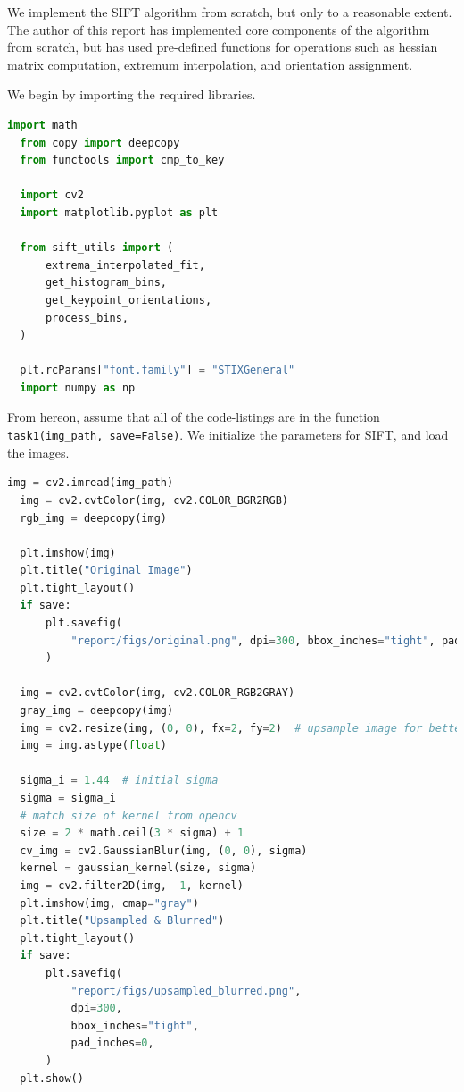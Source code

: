 \documentclass[11pt,a4paper]{article}
\begin{document}
We implement the SIFT algorithm from scratch, but only to a reasonable extent. The author of this report has implemented core components of the algorithm from scratch, but has used pre-defined functions for operations such as hessian matrix computation, extremum interpolation, and orientation assignment.

We begin by importing the required libraries.
\begin{lstlisting}[language=Python, caption=Importing libraries]
  import math
  from copy import deepcopy
  from functools import cmp_to_key
  
  import cv2
  import matplotlib.pyplot as plt
  
  from sift_utils import (
      extrema_interpolated_fit,
      get_histogram_bins,
      get_keypoint_orientations,
      process_bins,
  )
  
  plt.rcParams["font.family"] = "STIXGeneral"
  import numpy as np
\end{lstlisting}

From hereon, assume that all of the code-listings are in the function \lstinline[columns=fixed]{task1(img_path, save=False)}. We initialize the parameters for SIFT, and load the images.

\begin{lstlisting}[language=Python, caption=Initializing parameters and loading images]
  img = cv2.imread(img_path)
  img = cv2.cvtColor(img, cv2.COLOR_BGR2RGB)
  rgb_img = deepcopy(img)

  plt.imshow(img)
  plt.title("Original Image")
  plt.tight_layout()
  if save:
      plt.savefig(
          "report/figs/original.png", dpi=300, bbox_inches="tight", pad_inches=0
      )

  img = cv2.cvtColor(img, cv2.COLOR_RGB2GRAY)
  gray_img = deepcopy(img)
  img = cv2.resize(img, (0, 0), fx=2, fy=2)  # upsample image for better results
  img = img.astype(float)

  sigma_i = 1.44  # initial sigma
  sigma = sigma_i
  # match size of kernel from opencv
  size = 2 * math.ceil(3 * sigma) + 1
  cv_img = cv2.GaussianBlur(img, (0, 0), sigma)
  kernel = gaussian_kernel(size, sigma)
  img = cv2.filter2D(img, -1, kernel)
  plt.imshow(img, cmap="gray")
  plt.title("Upsampled & Blurred")
  plt.tight_layout()
  if save:
      plt.savefig(
          "report/figs/upsampled_blurred.png",
          dpi=300,
          bbox_inches="tight",
          pad_inches=0,
      )
  plt.show()
\end{lstlisting}
\end{document}
